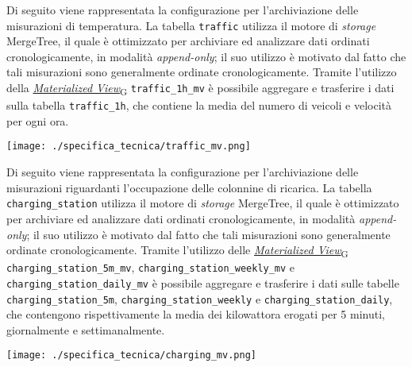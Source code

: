 Di seguito viene rappresentata la configurazione per l'archiviazione delle misurazioni di temperatura. La tabella \texttt{traffic} utilizza il motore di \textit{storage}
MergeTree, il quale è ottimizzato per archiviare ed analizzare dati ordinati cronologicamente, in modalità \textit{append-only}; il suo
utilizzo è motivato dal fatto che tali misurazioni sono generalmente ordinate cronologicamente.
Tramite l'utilizzo della \href{https://7last.github.io/docs/pb/documentazione-interna/glossario\#materialized-view}{\textit{Materialized View}\textsubscript{G}} \texttt{traffic\_1h\_mv}
è possibile aggregare e trasferire i dati sulla tabella \texttt{traffic\_1h}, che contiene la media del numero di veicoli e velocità per ogni ora.
\begin{center}
	\texttt{[image: ./specifica\_tecnica/traffic\_mv.png]}
\end{center}

Di seguito viene rappresentata la configurazione per l'archiviazione delle misurazioni riguardanti l'occupazione delle colonnine di ricarica.
La tabella \texttt{charging\_station} utilizza il motore di \textit{storage} MergeTree, il quale è ottimizzato per archiviare ed analizzare dati ordinati cronologicamente,
in modalità \textit{append-only}; il suo utilizzo è motivato dal fatto che tali misurazioni sono generalmente ordinate cronologicamente.
Tramite l'utilizzo delle \href{https://7last.github.io/docs/pb/documentazione-interna/glossario\#materialized-view}{\textit{Materialized View}\textsubscript{G}} \texttt{charging\_station\_5m\_mv}, \texttt{charging\_station\_weekly\_mv} e \\\texttt{charging\_station\_daily\_mv}
è possibile aggregare e trasferire i dati sulle tabelle \\ \texttt{charging\_station\_5m}, \texttt{charging\_station\_weekly} e \texttt{charging\_station\_daily},
che contengono rispettivamente la media dei kilowattora erogati per 5 minuti, giornalmente e settimanalmente.
\begin{center}
	\texttt{[image: ./specifica\_tecnica/charging\_mv.png]}
\end{center}

